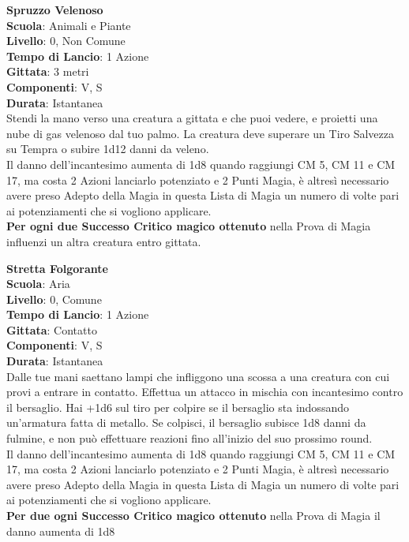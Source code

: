 \begin{multicols}{2}
\medskip\textbf{Spruzzo Velenoso}\\
\textbf{Scuola}: Animali e Piante\\
\textbf{Livello}: 0, Non Comune\\
\textbf{Tempo di Lancio}: 1 Azione\\
\textbf{Gittata}: 3 metri\\
\textbf{Componenti}: V, S\\
\textbf{Durata}: Istantanea\\
Stendi la mano verso una creatura a gittata e che puoi vedere, e proietti una nube di gas velenoso dal tuo palmo. La creatura deve superare un Tiro Salvezza su Tempra o subire 1d12 danni da veleno. \\
Il danno dell'incantesimo aumenta di 1d8 quando raggiungi CM 5, CM 11 e CM 17, ma costa 2 Azioni lanciarlo potenziato e 2 Punti Magia, è altresì necessario avere preso Adepto della Magia in questa Lista di Magia un numero di volte pari ai potenziamenti che si vogliono applicare.\\
\textbf{Per ogni due Successo Critico magico ottenuto} nella Prova di Magia influenzi un altra creatura entro gittata.

\medskip\textbf{Stretta Folgorante}\\
\textbf{Scuola}: Aria\\
\textbf{Livello}: 0, Comune\\
\textbf{Tempo di Lancio}: 1 Azione\\
\textbf{Gittata}: Contatto\\
\textbf{Componenti}: V, S\\
\textbf{Durata}: Istantanea\\
Dalle tue mani saettano lampi che infliggono una scossa a una creatura con cui provi a entrare in contatto. Effettua un attacco in mischia con incantesimo contro il bersaglio. Hai +1d6 sul tiro per colpire se il bersaglio sta indossando un'armatura fatta di metallo. Se colpisci, il bersaglio subisce 1d8 danni da fulmine, e non può effettuare reazioni fino all'inizio del suo prossimo round.\\
Il danno dell'incantesimo aumenta di 1d8 quando raggiungi CM 5, CM 11 e CM 17, ma costa 2 Azioni lanciarlo potenziato e 2 Punti Magia, è altresì necessario avere preso Adepto della Magia in questa Lista di Magia un numero di volte pari ai potenziamenti che si vogliono applicare.\\
\textbf{Per due ogni Successo Critico magico ottenuto} nella Prova di Magia il danno aumenta di 1d8


\end{multicols}
